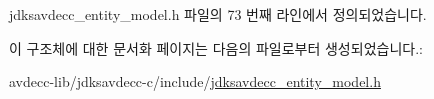 jdksavdecc\+\_\+entity\+\_\+model.\+h 파일의 73 번째 라인에서 정의되었습니다.



이 구조체에 대한 문서화 페이지는 다음의 파일로부터 생성되었습니다.\+:\begin{DoxyCompactItemize}
\item 
avdecc-\/lib/jdksavdecc-\/c/include/\hyperlink{jdksavdecc__entity__model_8h}{jdksavdecc\+\_\+entity\+\_\+model.\+h}\end{DoxyCompactItemize}
